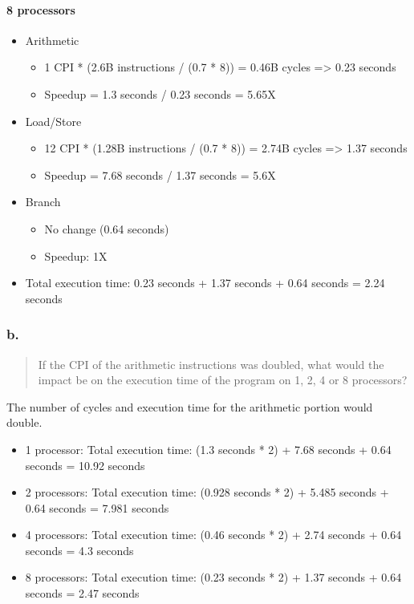 \documentclass[]{article}
\let\oldparagraph\paragraph
\renewcommand{\paragraph}[1]{\oldparagraph{#1}\mbox{}}
\begin{document}
\paragraph{8 processors}\label{header-n4998}

\begin{itemize}
\item
  Arithmetic

  \begin{itemize}
  \item
    1 CPI * (2.6B instructions / (0.7 * 8)) = 0.46B cycles
    =\textgreater{} 0.23 seconds
  \item
    Speedup = 1.3 seconds / 0.23 seconds = 5.65X
  \end{itemize}
\item
  Load/Store

  \begin{itemize}
  \item
    12 CPI * (1.28B instructions / (0.7 * 8)) = 2.74B cycles
    =\textgreater{} 1.37 seconds
  \item
    Speedup = 7.68 seconds / 1.37 seconds = 5.6X
  \end{itemize}
\item
  Branch

  \begin{itemize}
  \item
    No change (0.64 seconds)
  \item
    Speedup: 1X
  \end{itemize}
\item
  Total execution time: 0.23 seconds + 1.37 seconds + 0.64 seconds =
  2.24 seconds
\end{itemize}

\subsubsection{b.}\label{header-n5033}

\begin{quote}
If the CPI of the arithmetic instructions was doubled, what would the
impact be on the execution time of the program on 1, 2, 4 or 8
processors?
\end{quote}

The number of cycles and execution time for the arithmetic portion would
double.

\begin{itemize}
\item
  1 processor: Total execution time: (1.3 seconds * 2) + 7.68 seconds +
  0.64 seconds = 10.92 seconds
\item
  2 processors: Total execution time: (0.928 seconds * 2) + 5.485
  seconds + 0.64 seconds = 7.981 seconds
\item
  4 processors: Total execution time: (0.46 seconds * 2) + 2.74 seconds
  + 0.64 seconds = 4.3 seconds
\item
  8 processors: Total execution time: (0.23 seconds * 2) + 1.37 seconds
  + 0.64 seconds = 2.47 seconds
\end{itemize}
\end{document}
